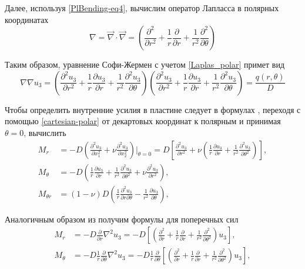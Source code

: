 Далее, используя \eqref{PlBending-eq4}, вычислим оператор Лапласса в полярных координатах
\begin{equation}
  \label{Laplas_polar}
  \nabla= \vec{\nabla} \cdot \vec{\nabla} = \left (\frac{\partial ^2}{\partial r^2}+\frac{1}{r} \frac{\partial}{\partial r}+\frac{1}{r^2}\frac{\partial ^2 }{\partial \theta} \right )
  \end{equation} 

Таким образом, уравнение Софи-Жермен с учетом \eqref{Laplas_polar} примет вид
\begin{equation}
  \label{Polar_Sofi-Germain}
  \nabla \nabla u_3= \left (\frac{\partial ^2 u_3}{\partial r^2}+\frac{1}{r} \frac{\partial u_3}{\partial r}+\frac{1}{r^2}\frac{\partial ^2 u_3}{\partial \theta} \right ) \left (\frac{\partial ^2 u_3}{\partial r^2}+\frac{1}{r} \frac{\partial u_3}{\partial r}+\frac{1}{r^2}\frac{\partial ^2 u_3}{\partial \theta} \right )=\frac{q \left (r, \theta \right )}{D}
\end{equation}

Чтобы определить внутренние усилия в пластине следует в формулах , переходя с помощью \eqref{cartesian-polar}  от декартовых координат к полярным и принимая $\theta=0$, вычислить
\begin{equation}
  \label{bbb}
  \begin{split}
      M_r &= -D \left ( \frac{\partial ^2 u_3}{\partial x_1^2}+ \nu \frac{\partial ^2 u_3}{\partial x_2^2} \right ) \bigg |_{\theta=0}=D \left [ \frac{\partial ^2 u_3}{\partial r^2} + \nu \left ( \frac{1}{r} \frac{\partial u_3}{\partial r}+ \frac{1}{r^2} \frac{\partial^2 u_3}{\partial \theta^2}\right ) \right ],\\
      M_{\theta} &= -D \left ( \frac{1}{r} \frac{\partial u_3}{\partial r} + \frac{1}{r^2} \frac{\partial^2 u_3}{\partial \theta^2} + \nu \frac{\partial^2 u_3}{\partial r^2} \right ),\\
      M_{\theta r} &= (1- \nu) D \left ( \frac{1}{r} \frac{\partial^2 u_3}{\partial r \partial \theta} - \frac{1}{r^2} \frac{\partial u_3}{\partial \theta}\right ),
    \end{split}
\end{equation}

Аналогичным образом из  получим формулы для поперечных сил 
\begin{equation}
  \label{bbb}
  \begin{split}
        M_r &= -D \frac{\partial }{\partial r} \nabla^2 u_3 = -D \left [ \left ( \frac{\partial^2}{\partial r} + \frac{1}{r}\frac{\partial}{\partial r}+ \frac{1}{r^2} \frac{\partial^2}{\partial \theta^2} \right ) u_3 \right ],\\
        M_{\theta} &= -D \frac{1}{r} \frac{\partial }{\partial \theta} \nabla^2 u_3 = -D \frac{1}{r} \frac{\partial}{\partial \theta} \left [ \left ( \frac{\partial^2}{\partial r} + \frac{1}{r}\frac{\partial}{\partial r}+ \frac{1}{r^2} \frac{\partial^2}{\partial \theta^2} \right ) u_3 \right ],
  \end{split}
\end{equation}

